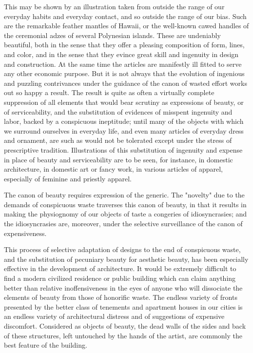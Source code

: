 \documentclass[12pt]{report}
\begin{document}
This may be shown by an illustration taken from outside the range of our
everyday habits and everyday contact, and so outside the range of
our bias. Such are the remarkable feather mantles of Hawaii, or the
well-known cawed handles of the ceremonial adzes of several Polynesian
islands. These are undeniably beautiful, both in the sense that they
offer a pleasing composition of form, lines, and color, and in the sense
that they evince great skill and ingenuity in design and construction.
At the same time the articles are manifestly ill fitted to serve any
other economic purpose. But it is not always that the evolution of
ingenious and puzzling contrivances under the guidance of the canon of
wasted effort works out so happy a result. The result is quite as
often a virtually complete suppression of all elements that would
bear scrutiny as expressions of beauty, or of serviceability, and the
substitution of evidences of misspent ingenuity and labor, backed by a
conspicuous ineptitude; until many of the objects with which we surround
ourselves in everyday life, and even many articles of everyday dress and
ornament, are such as would not be tolerated except under the stress of
prescriptive tradition. Illustrations of this substitution of ingenuity
and expense in place of beauty and serviceability are to be seen, for
instance, in domestic architecture, in domestic art or fancy work,
in various articles of apparel, especially of feminine and priestly
apparel.

The canon of beauty requires expression of the generic. The "novelty"
due to the demands of conspicuous waste traverses this canon of beauty,
in that it results in making the physiognomy of our objects of taste a
congeries of idiosyncrasies; and the idiosyncrasies are, moreover, under
the selective surveillance of the canon of expensiveness.

This process of selective adaptation of designs to the end of
conspicuous waste, and the substitution of pecuniary beauty for
aesthetic beauty, has been especially effective in the development of
architecture. It would be extremely difficult to find a modern civilized
residence or public building which can claim anything better than
relative inoffensiveness in the eyes of anyone who will dissociate the
elements of beauty from those of honorific waste. The endless variety of
fronts presented by the better class of tenements and apartment houses
in our cities is an endless variety of architectural distress and of
suggestions of expensive discomfort. Considered as objects of beauty,
the dead walls of the sides and back of these structures, left untouched
by the hands of the artist, are commonly the best feature of the
building.
\end{document}
